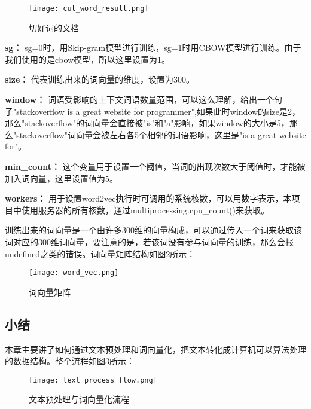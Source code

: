 \begin{figure}[H]
  \begin{center}
    \texttt{[image: cut\_word\_result.png]}
    \caption{切好词的文档}
    \label{cut_word_file}
  \end{center}
\end{figure} 

\textbf{sg：} sg=0时，用Skip-gram模型进行训练，sg=1时用CBOW模型进行训练。由于我们使用的是cbow模型，所以这里设置为1。

\textbf{size：} 代表训练出来的词向量的维度，设置为300。

\textbf{window：} 词语受影响的上下文词语数量范围，可以这么理解，给出一个句子"stackoverflow is a great website for programmer",如果此时window的size是2，那么"stackoverflow"的词向量会直接被"is"和"a"影响，如果window的大小是5，那么"stackoverflow"词向量会被左右各5个相邻的词语影响，这里是"is a great website for"。

\textbf{min\_count：} 这个变量用于设置一个阈值，当词的出现次数大于阈值时，才能被加入词向量，这里设置值为5。

\textbf{workers：} 用于设置word2vec执行时可调用的系统核数，可以用数字表示，本项目中使用服务器的所有核数，通过multiprocessing.cpu\_count()来获取。

训练出来的词向量是一个由许多300维的向量构成，可以通过传入一个词来获取该词对应的300维词向量，要注意的是，若该词没有参与词向量的训练，那么会报undefined之类的错误。词向量矩阵结构如图\ref{word_vec_array}所示：

\begin{figure}[H]
  \begin{center}
    \texttt{[image: word\_vec.png]}
    \caption{词向量矩阵}
    \label{word_vec_array}
  \end{center}
\end{figure} 

\subsection{小结}
本章主要讲了如何通过文本预处理和词向量化，把文本转化成计算机可以算法处理的数据结构。整个流程如图\ref{pre_process_flow}所示：

\begin{figure}[H]
  \begin{center}
    \texttt{[image: text\_process\_flow.png]}
    \caption{文本预处理与词向量化流程}
    \label{pre_process_flow}
  \end{center}
\end{figure} 

